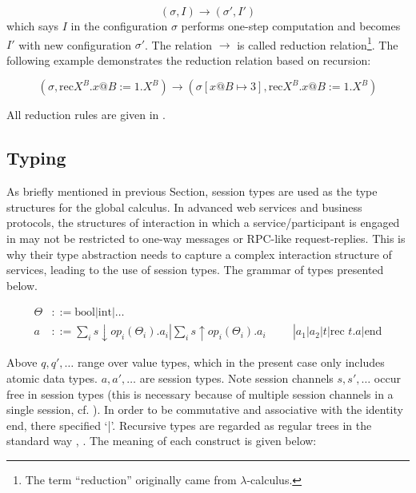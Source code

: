 \begin{equation}
(\sigma, I) \rightarrow (\sigma', I')
\end{equation}
which says $I$ in the configuration $\sigma$ performs one-step computation and becomes $I'$ with new configuration $\sigma'$. The relation $ \rightarrow $ is called reduction relation\footnote{ The term ``reduction'' originally came from  $\lambda$-calculus.}. The following example demonstrates the reduction relation based on recursion:

\begin{equation}
(\sigma, \text{rec}X^B.x@B := 1.X^B) \rightarrow (\sigma[x@B  \mapsto 3], \text{rec}X^B.x@B := 1.X^B)
\end{equation}

All reduction rules are given in \cite{com-centered-basis}.

\subsection{Typing}

As briefly mentioned in previous Section, session types \cite{lang-primitives} are used as the type structures for the global calculus. In advanced web services and business protocols, the structures of interaction in which a service/participant is engaged in may not be restricted to one-way messages or RPC-like request-replies. This is why their type abstraction needs to capture a complex interaction structure of services, leading to the use of session types. The grammar of types presented below.


\begin{equation}
\begin{split}
\Theta & ::= \text{bool} | \text{int} | \dots \\
a & ::= \sum_i s \downarrow op_i(\Theta_i).a_i | \sum_i s \uparrow op_i(\Theta_i).a_i \hspace{1cm} | a_1|a_2|t|\text{rec }t.a|\text{end}
\end{split}
\end{equation}

Above $q, q', \dots$ range over value types, which in the present case only includes atomic data types. $a, a', \dots$ are session types. Note session channels $s, s', \dots$ occur free in session types (this is necessary because of multiple session channels in a single session, cf. \cite{pcalc-control}). In order to be commutative and associative with the identity end, there specified `|'. Recursive types are regarded as regular trees in the standard way \cite{types-and-langs}, \cite{typing-and-subtyping}. The meaning of each construct is given below:

